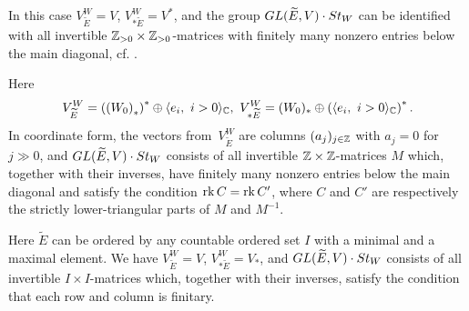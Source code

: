 \documentclass[11pt, a4paper]{article}
\begin{document}
\label{example:generalized_flag_full} In this case $V^W_{\widetilde{E}}=V$, $V^W_{*\widetilde{E}}=V^*$, and the group $GL(\widetilde{E},V) \cdot St_W$ can be identified with all invertible  $\mathbb{Z}_{>0}\times \mathbb{Z}_{>0}$-matrices with finitely many nonzero entries below the main diagonal, cf. \cite{Penkov}. 

\label{example:generalized_flag_basis_E_tilde} Here $$V^W_{\widetilde{E}}=\left(\left(W_0\right)_*\right)^*\oplus  \langle e_i,~i>0\rangle_{\mathbb{C}},~V^W_{*\widetilde{E}}=(W_0)_*\oplus \left( \langle e_i,~i>0\rangle_{\mathbb{C}}\right)^*.$$ In coordinate form, the vectors from~$V^W_{\widetilde{E}}$ are columns $(a_j)_{j\in \mathbb{Z}}$ with $a_j=0$ for $j\gg 0$, and %
$GL(\widetilde{E},V) \cdot St_W$ consists of   all invertible $\mathbb{Z}  \times \mathbb{Z} $-matrices $M$ which, together with their inverses, have finitely many nonzero entries below the main diagonal and satisfy the condition $\mathrm{rk}\, C=\mathrm{rk}\, C'$, where $C$ and $C'$ are respectively the strictly lower-triangular parts of $M$ and $M^{-1}$.

\label{example:generalized_flag_W_1_W_-1} Here $\widetilde{E}$ can be ordered by any countable ordered set $I$ with a minimal and a maximal element. We have $V^W_{\widetilde{E }}=V$, $V^W_{*\widetilde{E}}=V_*$, and $GL(\widetilde{E},V) \cdot St_W$ consists of all invertible $I\times I$-matrices %
which, together with their inverses, satisfy the condition that each row and column is finitary. %
\end{document}
